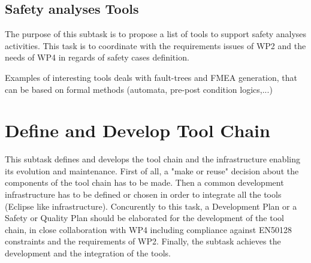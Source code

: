 \documentclass{template/openetcs_article}
\begin{document}
\subsection{Safety analyses Tools}


The purpose of this subtask is to propose a list of tools to  support  safety  analyses activities. This task  is to  coordinate with  the requirements issues of WP2 and the needs of WP4 in regards of safety cases definition.

Examples of interesting tools deals with fault-trees and FMEA generation, that can be based on formal methods (automata, pre-post condition logics,...) 
  
% 
%


\section{Define and Develop Tool Chain}\label{sec:devtoolchain}


This subtask defines and develops the tool chain and the infrastructure enabling
its evolution and maintenance. First of all, a "make or reuse" decision about
the components of the tool chain has to be made. Then a common development
infrastructure has to be defined or chosen in order to integrate all the tools
(Eclipse like infrastructure). 
Concurently to this task, a  Development Plan or a Safety or Quality Plan should
be elaborated for the development of the tool chain, in close collaboration with WP4 
including compliance against EN50128 constraints and the requirements of WP2.
Finally, the subtask achieves the development and the integration of the tools.
\end{document}
